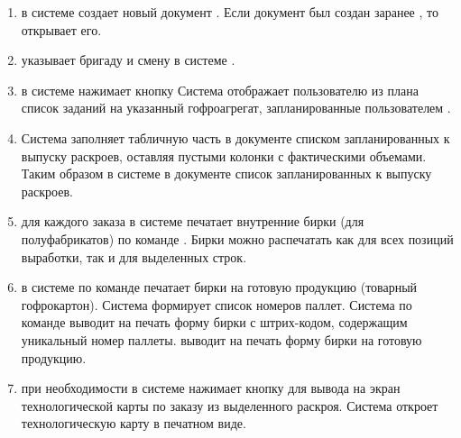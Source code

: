 \begin{enumerate}
\item  \gaoperator в системе \gofro создает новый документ . Если документ был создан заранее \planner, то \gaoperator открывает его.
\item  \gaoperator указывает бригаду и смену в системе \gofro.
\item  \gaoperator в системе \gofro нажимает кнопку  Система \gofro отображает пользователю из плана список заданий на указанный гофроагрегат, запланированные пользователем \planner. 
\item Система \gofro заполняет табличную часть в документе  списком запланированных к выпуску раскроев, оставляя пустыми колонки с фактическими объемами. Таким образом  в системе \gofro в документе  список запланированных к выпуску раскроев.
\item  \gaoperator	для каждого заказа  в системе \gofro печатает внутренние бирки (для полуфабрикатов) по команде . Бирки можно распечатать как для всех позиций выработки, так и для выделенных строк.
\item  \gaoperator в системе \gofro по команде  печатает бирки на готовую продукцию (товарный гофрокартон).%
Система \gofro формирует список номеров паллет. Система \gofro по команде 
\ifnum{}
   выводит на печать форму бирки с штрих-кодом, 
   содержащим уникальный номер паллеты.
\else
   выводит на печать форму бирки на готовую продукцию. 
\fi
\item  \gaoperator	при необходимости в системе \gofro  нажимает кнопку  для вывода на экран технологической  карты по заказу из выделенного раскроя. Система \gofro откроет технологическую карту в печатном виде.

\end{enumerate}
